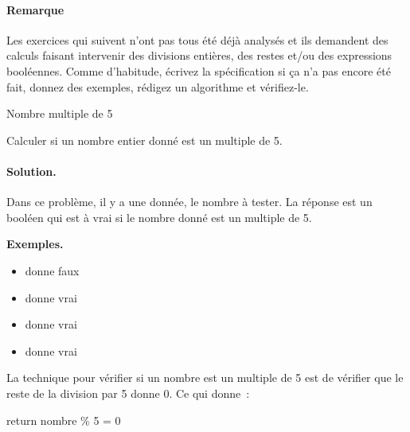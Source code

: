 \bigskip
\bigskip
\bigskip
\begin{Emphase}
	
	\paragraph{Remarque}
	Les exercices qui suivent n’ont pas tous été déjà analysés et ils demandent
	des calculs faisant intervenir des divisions entières, des restes et/ou des
	expressions booléennes.  Comme d’habitude, écrivez la spécification si ça
	n’a pas encore été fait, donnez des exemples, rédigez un algorithme et
	vérifiez-le.

\end{Emphase}

		\begin{Exercice}{Nombre multiple de 5}

			\label{algo:mult5}
			Calculer si un nombre entier donné est un multiple de 5.

			\clearpage
			\paragraph{Solution.}
			Dans ce problème,
			il y a une donnée, le nombre à tester.
			La réponse est un booléen
			qui est à vrai si le nombre donné est un multiple de 5.
			\begin{center}
			\end{center}
			\textbf{Exemples.}
			\begin{multicols}{4}
				\begin{itemize}
					\item {} donne faux
					\item {} donne vrai
					\item {} donne vrai
					\item {} donne vrai
				\end{itemize}
			\end{multicols}
			La technique pour vérifier si un nombre est
			un multiple de 5 est de vérifier que le reste
			de la division par 5 donne 0.
			Ce qui donne~:
			\begin{langagenaturel}
				return nombre \% 5 = 0
			\end{langagenaturel}
		

\end{Exercice}
